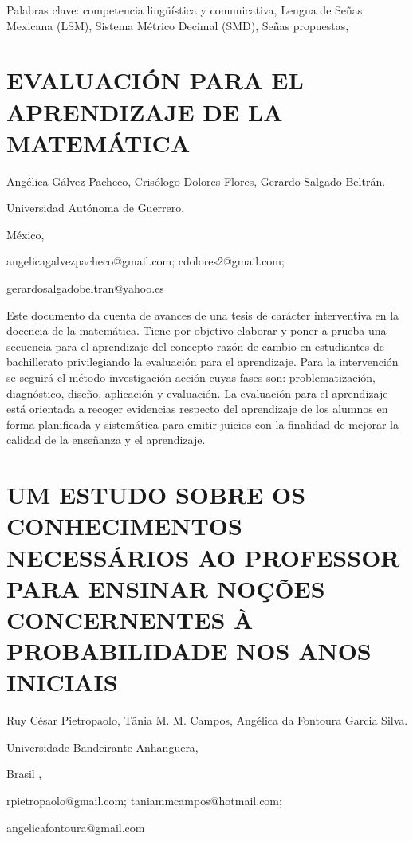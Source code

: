 Palabras clave: competencia lingüística y comunicativa, Lengua de
Señas Mexicana (LSM), Sistema Métrico Decimal (SMD), Señas propuestas, 


\section{EVALUACIÓN PARA EL APRENDIZAJE DE LA MATEMÁTICA}

\begin{datos}

Angélica Gálvez Pacheco, Crisólogo Dolores Flores, Gerardo Salgado
Beltrán.

Universidad Autónoma de Guerrero,

México,

angelicagalvezpacheco@gmail.com; cdolores2@gmail.com;

gerardosalgadobeltran@yahoo.es 

\end{datos}

Este documento da cuenta de avances de una tesis de carácter interventiva
en la docencia de la matemática. Tiene por objetivo elaborar y poner
a prueba una secuencia para el aprendizaje del concepto razón de cambio
en estudiantes de bachillerato privilegiando la evaluación para el
aprendizaje. Para la intervención se seguirá el método investigación-acción
cuyas fases son: problematización, diagnóstico, diseño, aplicación
y evaluación. La evaluación para el aprendizaje está orientada a recoger
evidencias respecto del aprendizaje de los alumnos en forma planificada
y sistemática para emitir juicios con la finalidad de mejorar la calidad
de la enseñanza y el aprendizaje. 


\section{UM ESTUDO SOBRE OS CONHECIMENTOS NECESSÁRIOS AO PROFESSOR PARA ENSINAR
NOÇÕES CONCERNENTES À PROBABILIDADE NOS ANOS INICIAIS}

\begin{datos}

Ruy César Pietropaolo, Tânia M. M. Campos, Angélica da Fontoura Garcia
Silva.

Universidade Bandeirante Anhanguera,

Brasil ,

rpietropaolo@gmail.com; taniammcampos@hotmail.com;

angelicafontoura@gmail.com

\end{datos}

